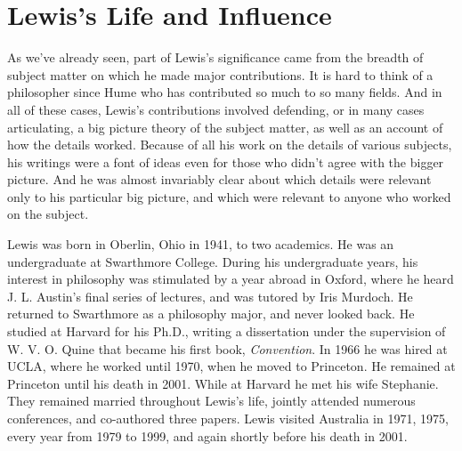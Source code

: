 %
%
%
%

\section{Lewis's Life and Influence} 
As we've already seen, part of Lewis's significance came from the breadth of subject matter on which he made major contributions. It is hard to think of a philosopher since Hume who has contributed so much to so many fields. And in all of these cases, Lewis's contributions involved defending, or in many cases articulating, a big picture theory of the subject matter, as well as an account of how the details worked. Because of all his work on the details of various subjects, his writings were a font of ideas even for those who didn't agree with the bigger picture. And he was almost invariably clear about which details were relevant only to his particular big picture, and which were relevant to anyone who worked on the subject.

Lewis was born in Oberlin, Ohio in 1941, to two academics. He was an undergraduate at Swarthmore College. During his undergraduate years, his interest in philosophy was stimulated by a year abroad in Oxford, where he heard J. L. Austin's final series of lectures, and was tutored by Iris Murdoch. He returned to Swarthmore as a philosophy major, and never looked back. He studied at Harvard for his Ph.D., writing a dissertation under the supervision of W. V. O. Quine that became his first book, \textit{Convention}. In 1966 he was hired at UCLA, where he worked until 1970, when he moved to Princeton. He remained at Princeton until his death in 2001. While at Harvard he met his wife Stephanie. They remained married throughout Lewis's life, jointly attended numerous conferences, and co-authored three papers. Lewis visited Australia in 1971, 1975, every year from 1979 to 1999, and again shortly before his death in 2001.

